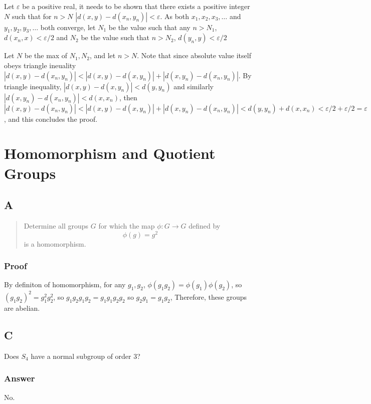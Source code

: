 \documentclass[11pt]{article}
\begin{document}
Let \(\varepsilon\) be a positive real, it needs to be shown that there exists a
positive integer \(N\) such that for \(n > N\) \(|d(x, y) - d(x_n, y_{n})| < \varepsilon\).
As both \(x_1, x_2, x_3, \ldots\) and \(y_1, y_2, y_3,
\ldots\) both converge, let \(N_{1}\) be the value such that any \(n > N_1\),
\(d(x_n, x) < \varepsilon / 2\) and \(N_2\) be the value such that  \(n > N_2\),
\(d(y_n, y) < \varepsilon / 2\)


Let \(N\) be the max of \(N_1, N_2\), and let \(n > N\). Note that since absolute value itself obeys
triangle ineuality \(|d(x, y) - d(x_n, y_{n})| < |d(x,y) - d(x, y_{n})| + |d(x,
y_n) - d(x_n, y_n)|\). By triangle inequality, \(|d(x,y) - d(x, y_{n})| < d(y,
y_n)\) and similarly \(|d(x,y_{n}) - d(x_n, y_{n})| < d(x,
x_n)\), then \(|d(x, y) - d(x_n, y_{n})| < |d(x,y) - d(x, y_{n})| + |d(x,
y_n) - d(x_n, y_n)| < d(y,
y_n) + d(x,
x_n) < \varepsilon / 2  + \varepsilon / 2 = \varepsilon\), and this concludes the proof.



\section{Homomorphism and Quotient Groups}
\label{sec:org222abc3}
\subsection{A}
\label{sec:org23eb57c}

\begin{quote}
Determine all groups \(G\) for which the map \(\phi : G \rightarrow G\) defined by
\begin{equation}
\label{eq:1}
\phi(g) = g^{2}
\end{equation}
is a homomorphism.
\end{quote}
\subsubsection{Proof}
\label{sec:org486155d}
By definiton of homomorphism, for any \(g_1, g_2\), \(\phi(g_1 g_2) =
\phi(g_{1}) \phi(g_{2})\), so \((g_1 g_{2})^{2}  =
g_{1}^{2} g_{2}^{2}\), so \(g_1 g_2 g_1 g_2 = g_1 g_1 g_2 g_2\) so \(g_2 g_1 =
g_1 g_2\), Therefore, these groups are abelian.
\subsection{C}
\label{sec:orgfdea19d}


Does \(S_4\) have a normal subgroup of order 3?
\subsubsection{Answer}
\label{sec:org8715aac}

No.
\end{document}
